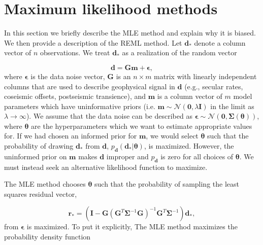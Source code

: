 \documentclass[10pt,a4paper]{article}
\begin{document}
\section{Maximum likelihood methods}
In this section we briefly describe the MLE method and explain why it is biased. We then provide a description of the REML method. Let $\mathbf{d_*}$ denote a column vector of $n$ observations. We treat $\mathbf{d_*}$ as a realization of the random vector

\begin{equation}\label{LangbeinModel}
  \mathbf{d} = \mathbf{Gm} + \mathbf{\epsilon},
\end{equation}
where $\mathbf{\epsilon}$ is the data noise vector, $\mathbf{G}$ is an $n \times m$ matrix with linearly independent columns that are used to describe geophysical signal in $\mathbf{d}$ (e.g., secular rates, coseismic offsets, postseismic transience), and $\mathbf{m}$ is a column vector of $m$ model parameters which have uninformative priors (i.e. $\mathbf{m} \sim \mathcal{N}(\mathbf{0},\lambda\mathbf{I})$ in the limit as $\lambda \to \infty$).  We assume that the data noise can be described as $\mathbf{\epsilon} \sim \mathcal{N}(\mathbf{0},\mathbf{\Sigma}(\mathbf{\theta}))$, where $\mathbf{\theta}$ are the hyperparameters which we want to estimate appropriate values for. If we had chosen an informed prior for $\mathbf{m}$, we would select $\mathbf{\theta}$ such that the probability of drawing $\mathbf{d_*}$ from $\mathbf{d}$, $p_\mathbf{d}(\mathbf{d_*}|\mathbf{\theta})$, is maximized. However, the uninformed prior on $\mathbf{m}$ makes $\mathbf{d}$ improper and $p_\mathbf{d}$ is zero for all choices of $\mathbf{\theta}$. We must instead seek an alternative likelihood function to maximize. 

The MLE method chooses $\mathbf{\theta}$ such that the probability of sampling the least squares residual vector,

\begin{equation}\label{ResidualRealization}
  \mathbf{r}_* =  \left(\mathbf{I} - \mathbf{G}\left(\mathbf{G}^T\mathbf{\Sigma}^{-1}\mathbf{G}\right)^{-1}\mathbf{G}^T\mathbf{\Sigma}^{-1}\right)\mathbf{d_*},
\end{equation}  
from $\mathbf{\epsilon}$ is maximized. To put it explicitly, The MLE method maximizes the probability density function
\end{document}
